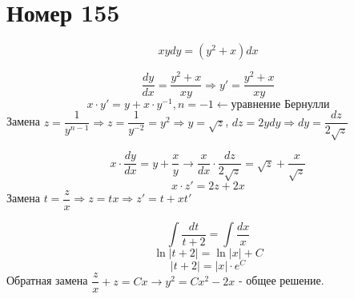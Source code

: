 \section*{Номер 155}

$$ xy dy = (y^2 + x) dx $$

\begin{solution}
    $$ \dfrac{dy}{dx} = \dfrac{y^2 + x}{xy} \Rightarrow y' = \dfrac{y^2 + x}{xy} $$
    $$ x \cdot y' = y + x \cdot y^{-1}, n = -1 \leftarrow \text{уравнение Бернулли} $$
    Замена $z = \dfrac{1}{y^{n - 1}} \Rightarrow z = \dfrac{1}{y^{-2}} = y^2 \Rightarrow y = \sqrt{z}$, $ dz = 2y dy \Rightarrow dy = \dfrac{dz}{2 \sqrt{z}}$ \par
    $$ x \cdot \dfrac{dy}{dx} = y + \dfrac{x}{y} \rightarrow \dfrac{x}{dx} \cdot \dfrac{dz}{2 \sqrt{z}} = \sqrt{z} + \dfrac{x}{\sqrt{z}} $$
    $$ x \cdot z' = 2z + 2x $$
    Замена $t = \dfrac{z}{x} \Rightarrow z = tx \Rightarrow z' = t + xt'$ \par
    $$ \int \dfrac{dt}{t + 2} = \int \dfrac{dx}{x} $$
    $$ \ln |t + 2| = \ln |x| + C $$
    $$ |t + 2| = |x| \cdot e^C $$
    Обратная замена $\dfrac{z}{x} + z = C x \rightarrow y^2 = Cx^2 - 2x$ - общее решение. 

\end{solution}\pagebreak